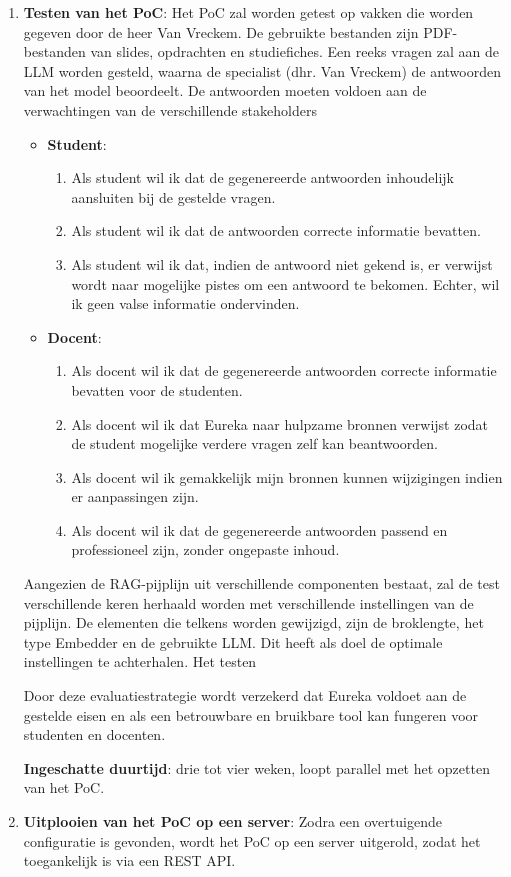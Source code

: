 \begin{enumerate}
    \item \textbf{Testen van het PoC}: Het PoC zal worden getest op vakken die worden gegeven door de heer Van Vreckem. De gebruikte bestanden zijn PDF-bestanden van slides, opdrachten en studiefiches. Een reeks vragen zal aan de LLM worden gesteld, waarna de specialist (dhr. Van Vreckem) de antwoorden van het model beoordeelt. De antwoorden moeten voldoen aan de verwachtingen van de verschillende stakeholders
    
    \begin{itemize} 
        \item \textbf{Student}:
        \begin{enumerate} 
            \item Als student wil ik dat de gegenereerde antwoorden inhoudelijk aansluiten bij de gestelde vragen.
            \item Als student wil ik dat de antwoorden correcte informatie bevatten. 
            \item Als student wil ik dat, indien de antwoord niet gekend is, er verwijst wordt naar mogelijke pistes om een antwoord te bekomen. Echter, wil ik geen valse informatie ondervinden.
        \end{enumerate}
        \item \textbf{Docent}:
        \begin{enumerate} 
            \item Als docent wil ik dat de gegenereerde antwoorden correcte informatie bevatten voor de studenten.
            \item Als docent wil ik dat Eureka naar hulpzame bronnen verwijst zodat de student mogelijke verdere vragen zelf kan beantwoorden. 
            \item Als docent wil ik gemakkelijk mijn bronnen kunnen wijzigingen indien er aanpassingen zijn.
            \item Als docent wil ik dat de gegenereerde antwoorden passend en professioneel zijn, zonder ongepaste inhoud.
        \end{enumerate}    
    \end{itemize}
    
    Aangezien de RAG-pijplijn uit verschillende componenten bestaat, zal de test verschillende keren herhaald worden met verschillende instellingen van de pijplijn. De elementen die telkens worden gewijzigd, zijn de broklengte, het type Embedder en de gebruikte LLM. Dit heeft als doel de optimale instellingen te achterhalen. Het testen
    
    Door deze evaluatiestrategie wordt verzekerd dat Eureka voldoet aan de gestelde eisen en als een betrouwbare en bruikbare tool kan fungeren voor studenten en docenten.
    
    \textbf{Ingeschatte duurtijd}: drie tot vier weken, loopt parallel met het opzetten van het PoC.
    
    \item \textbf{Uitplooien van het PoC op een server}: Zodra een overtuigende configuratie is gevonden, wordt het PoC op een server uitgerold, zodat het toegankelijk is via een REST API.
\end{enumerate}

